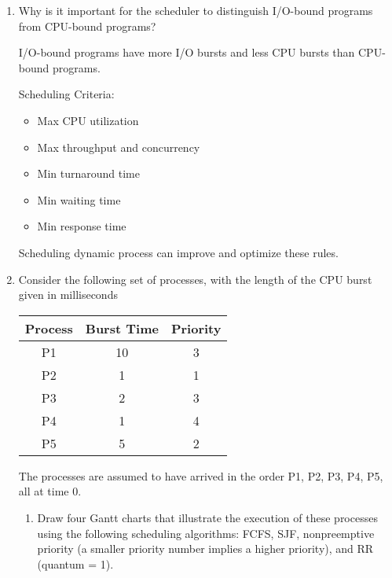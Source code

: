\begin{enumerate}
    
    \item Why is it important for the scheduler to distinguish I/O-bound programs from CPU-bound programs?
    
    I/O-bound programs have more I/O bursts and less CPU bursts than CPU-bound programs.
    
    Scheduling Criteria:
    
    \begin{itemize}
        \item Max CPU utilization
        \item Max throughput and concurrency
        \item Min turnaround time
        \item Min waiting time
        \item Min response time
    \end{itemize}
    
    Scheduling dynamic process can improve and optimize these rules.
    
    \item Consider the following set of processes, with the length of the CPU burst given in milliseconds
    
    \begin{center}
    \begin{tabular}{|c|c|c|}
        \hline
        Process & Burst Time & Priority \\
        \hline
        P1 & 10 & 3 \\
        \hline
        P2 & 1 & 1 \\
        \hline
        P3 & 2 & 3 \\
        \hline
        P4 & 1 & 4 \\
        \hline
        P5 & 5 & 2 \\
        \hline
    \end{tabular}
    \end{center}
    
    The processes are assumed to have arrived in the order P1, P2, P3, P4, P5, all at time 0.
    
    \begin{enumerate}    
        \item Draw four Gantt charts that illustrate the execution of these processes using the following scheduling algorithms: FCFS, SJF, nonpreemptive priority (a smaller priority number implies a higher priority), and RR (quantum = 1).
        

\end{enumerate}
\end{enumerate}
